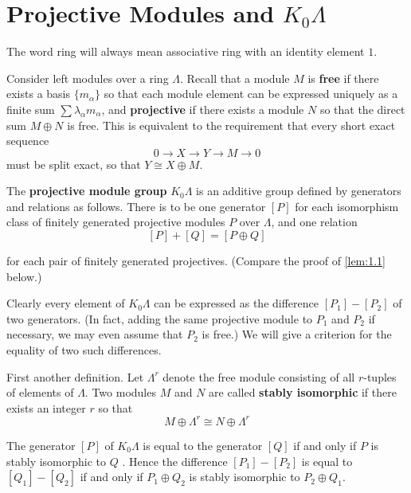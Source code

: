 \chapter{Projective Modules and $K_{0} \Lambda $}
\label{chap1}

The word ring will always mean associative ring with an identity element $1$.

Consider left modules over a ring $\Lambda$. Recall that a module $M$ is \textbf{free} if there exists a basis $\{m_{\alpha}\}$ so that each module element can be expressed uniquely as a finite sum $\sum \lambda_{\alpha} m_{\alpha}$, and \textbf{projective} if there exists a module $N$ so that the direct sum $M \oplus N$ is free. This is equivalent to the requirement that every short exact sequence
\[
	0 \to X \to Y \to M \to 0
\]
must be split exact, so that $Y \cong X \oplus M$.

The \textbf{projective module group} $K_{0}\Lambda$ is an additive group defined by generators and relations as follows. There is to be one generator $[P]$ for each isomorphism class of finitely generated projective modules $P$ over $\Lambda$, and one relation
\[
[P]+[Q]=[P \oplus Q]
\]

for each pair of finitely generated projectives. (Compare the proof of \autoref{lem:1.1} below.)

Clearly every element of $K_{0} \Lambda$ can be expressed as the difference $\left[P_{1}\right]-\left[P_{2}\right]$ of two generators. (In fact, adding the same projective module to $P_{1}$ and $P_{2}$ if necessary, we may even assume that $P_{2}$ is free.) We will give a criterion for the equality of two such differences.

First another definition. Let $\Lambda^{r}$ denote the free module consisting of all $r$-tuples of elements of $\Lambda$. Two modules $M$ and $N$ are called \textbf{stably isomorphic} if there exists an integer $r$ so that
\[
M \oplus \Lambda^{r} \cong N \oplus \Lambda^{r}
\]

\begin{lem}\label{lem:1.1}
	The generator $[P]$ of $K_{0} \Lambda$ is equal to the generator $[Q]$ if and only if $P$ is stably isomorphic to $Q$ . Hence the difference $\left[P_{1}\right]-\left[P_{2}\right]$ is equal to $\left[Q_{1}\right]-\left[Q_{2}\right]$ if and only if $P_{1} \oplus Q_{2}$ is stably isomorphic to $P_{2} \oplus Q_{1}$.
\end{lem}

